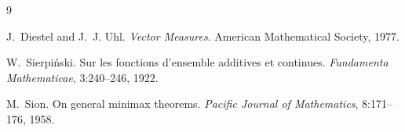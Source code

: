 \documentclass[11pt]{article}
\theoremstyle{plain}
\theoremstyle{definition}
\begin{document}
\begin{thebibliography}{9}

J.~Diestel and J.~J. Uhl.
\newblock \emph{Vector Measures}.
\newblock American Mathematical Society, 1977.

W.~Sierpi\'nski.
\newblock Sur les fonctions d'ensemble additives et continues.
\newblock \emph{Fundamenta Mathematicae}, 3:240--246, 1922.

M.~Sion.
\newblock On general minimax theorems.
\newblock \emph{Pacific Journal of Mathematics}, 8:171--176, 1958.

\end{thebibliography}
\end{document}
